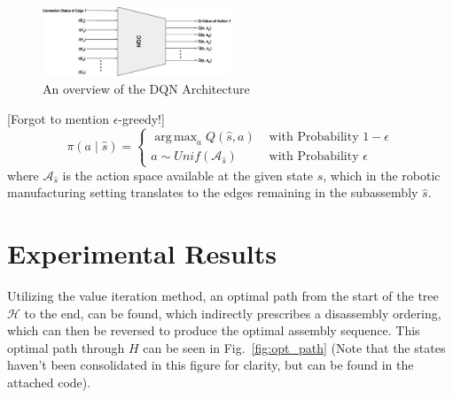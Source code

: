 \documentclass{article}
\DeclareMathOperator*{\argmax}{arg\,max}
\begin{document}
\begin{figure}[!htb]
\centering
\includegraphics[width=0.5\textwidth]{figs/DQNArchitecture.eps}
  \caption{An overview of the DQN Architecture}\label{fig: DQN}
\end{figure}

{\color{red}[Forgot to mention $\epsilon$-greedy!]}
\begin{equation}
    \pi(a \mid \hat{s})= \begin{cases}
    \argmax_a Q(\hat{s}, a) & \text { with Probability } 1-\epsilon \\ 
    a \sim Unif\left(\mathcal{A}_{\hat{s}}\right) & \text { with Probability }\epsilon
    \end{cases}
\end{equation}
where $\mathcal{A}_{\hat{s}}$ is the action space available at the given state $\hat{s}$, which in the robotic manufacturing setting translates to the edges remaining in the subassembly $\hat{s}$.


\section{Experimental Results}

Utilizing the value iteration method, an optimal path from the start of the tree $\mathcal{H}$ to the end, can be found, which indirectly prescribes a disassembly ordering, which can then be reversed to produce the optimal assembly sequence. This optimal path through $H$ can be seen in Fig.~\ref{fig:opt_path} (Note that the states haven't been consolidated in this figure for clarity, but can be found in the attached code).
\end{document}

